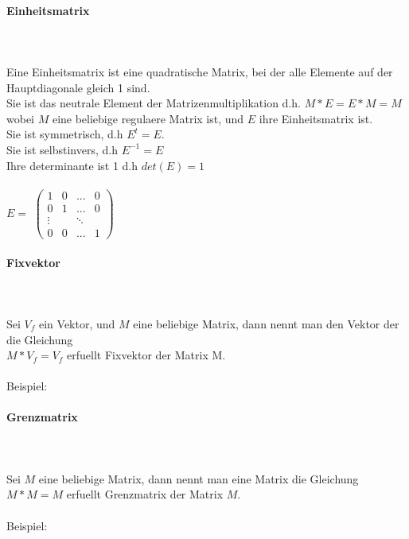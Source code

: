 \documentclass[a4paper]{article} %
\begin{document}
	\paragraph{Einheitsmatrix} 
	 \hspace{0 cm} \\ \noindent \\ Eine Einheitsmatrix ist eine quadratische Matrix, bei der alle Elemente auf der Hauptdiagonale gleich 1 sind.\\
	Sie ist das neutrale Element der Matrizenmultiplikation d.h. $M*E = E*M = M$ wobei $M$ eine beliebige regulaere Matrix ist, und $E$ ihre Einheitsmatrix ist.\\
	Sie ist symmetrisch, d.h $E^{t}=E$.\\
	Sie ist selbstinvers, d.h $E^{-1}=E$\\
	Ihre determinante ist 1 d.h $det(E)=1$\\\\
	$E =$
		$
		\begin{pmatrix}
		1 & 0 	& ... 	& 0\\
		0 & 1 	& ...	& 0\\
		\vdots  &     	& \ddots  \\
		0 & 0	& ...	& 1
		\end{pmatrix}
		$\\

	\newpage
	\paragraph{Fixvektor}
		\hspace{0 cm} \\ \noindent \\
	Sei  $V_f$ ein Vektor, und $M$ eine beliebige Matrix, dann nennt man den Vektor der die Gleichung \\	$M * V_f = V_f$ erfuellt Fixvektor der Matrix M.\\\\
	Beispiel:

	\paragraph{Grenzmatrix}
	 \hspace{0 cm} \\ \noindent \\
	Sei $M$ eine beliebige Matrix, dann nennt man eine Matrix die Gleichung $M * M = M$ erfuellt Grenzmatrix der Matrix $M$.
	\\\\
	Beispiel:
	\newpage
\end{document}
